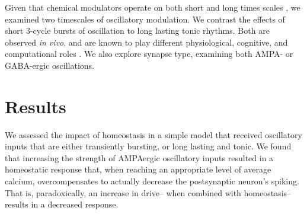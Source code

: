\documentclass{article}
\begin{document}
Given that chemical modulators operate on both short and long times scales \cite{Marinelli2014,Marder2014,Cohen2015,Daw2002}, we examined two timescales of oscillatory modulation. We contrast the effects of short 3-cycle bursts of oscillation to long lasting tonic rhythms. Both are observed {\textit{in vivo}}, and are known to play different physiological, cognitive, and computational roles \cite{Lundqvist2016,vanEde2018,Peterson2017}. We also explore synapse type, examining both AMPA- or GABA-ergic oscillations. 


\section*{Results}
We assessed the impact of homeostasis in a simple model that received oscillatory inputs that are either transiently bursting, or long lasting and tonic. We found that increasing the strength of AMPAergic oscillatory inputs resulted in a homeostatic response that, when reaching an appropriate level of average calcium, overcompensates to actually decrease the postsynaptic neuron's spiking. That is, paradoxically, an increase in drive-- when combined with homeostasis--results in a decreased response. 
\end{document}
